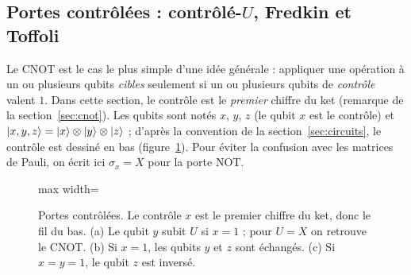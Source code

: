 \subsection{Portes contrôlées : contrôlé-\texorpdfstring{$U$}{U}, Fredkin et Toffoli}\label{sec:controlees}

Le CNOT est le cas le plus simple d'une idée générale : appliquer une opération à un ou
plusieurs qubits \emph{cibles} seulement si un ou plusieurs qubits de \emph{contrôle} valent $1$.
Dans cette section, le contrôle est le \emph{premier} chiffre
du ket (remarque de la section~\ref{sec:cnot}). Les qubits sont notés $x$, $y$, $z$ (le qubit $x$ est le contrôle) et
$|x,y,z\rangle=|x\rangle\otimes|y\rangle\otimes|z\rangle$ ; d'après la convention de la section~\ref{sec:circuits}, le
contrôle est dessiné en bas (figure~\ref{fig:controlees}). Pour éviter la confusion avec les
matrices de Pauli, on écrit ici $\sigma_x=X$ pour la porte NOT.

\begin{figure}[!ht]
\centering
\begin{adjustbox}{max width=\linewidth}
\end{adjustbox}
\caption{Portes contrôlées. Le contrôle $x$ est le premier chiffre du ket, donc le fil du bas.
(a) Le qubit $y$ subit $U$ si $x=1$ ; pour $U=X$ on retrouve le CNOT. (b) Si $x=1$, les qubits
$y$ et $z$ sont échangés. (c) Si $x=y=1$, le qubit $z$ est inversé.}
\label{fig:controlees}
\end{figure}

